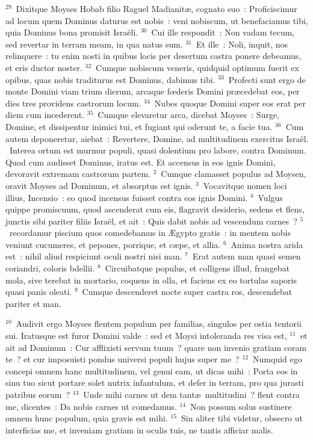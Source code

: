 ${}^{29}$~Dixitque Moyses Hobab filio Raguel Madianit\ae , cognato suo~: Proficiscimur ad locum quem Dominus daturus est nobis~: veni nobiscum, ut benefaciamus tibi, quia Dominus bona promisit Isra\"eli.
${}^{30}$~Cui ille respondit~: Non vadam tecum, sed revertar in terram meam, in qua natus sum.
${}^{31}$~Et ille~: Noli, inquit, nos relinquere~: tu enim nosti in quibus locis per desertum castra ponere debeamus, et eris ductor noster.
${}^{32}$~Cumque nobiscum veneris, quidquid optimum fuerit ex opibus, quas nobis traditurus est Dominus, dabimus tibi.
${}^{33}$~Profecti sunt ergo de monte Domini viam trium dierum, arcaque fœderis Domini pr\ae cedebat eos, per dies tres providens castrorum locum.
${}^{34}$~Nubes quoque Domini super eos erat per diem cum incederent.
${}^{35}$~Cumque elevaretur arca, dicebat Moyses~: Surge, Domine, et dissipentur inimici tui, et fugiant qui oderunt te, a facie tua.
${}^{36}$~Cum autem deponeretur, aiebat~: Revertere, Domine, ad multitudinem exercitus Isra\"el.
~\lettrine[lines=10,image=true,loversize=0.05,lraise=-0.03]{I}{}nterea ortum est murmur populi, quasi dolentium pro labore, contra Dominum. Quod cum audisset Dominus, iratus est. Et accensus in eos ignis Domini, devoravit extremam castrorum partem.
${}^{2}$~Cumque clamasset populus ad Moysen, oravit Moyses ad Dominum, et absorptus est ignis.
${}^{3}$~Vocavitque nomen loci illius, Incensio~: eo quod incensus fuisset contra eos ignis Domini.
${}^{4}$~Vulgus quippe promiscuum, quod ascenderat cum eis, flagravit desiderio, sedens et flens, junctis sibi pariter filiis Isra\"el, et ait~: Quis dabit nobis ad vescendum carnes~?
${}^{5}$~recordamur piscium quos comedebamus in \AE gypto gratis~: in mentem nobis veniunt cucumeres, et pepones, porrique, et c\ae pe, et allia.
${}^{6}$~Anima nostra arida est~: nihil aliud respiciunt oculi nostri nisi man.
${}^{7}$~Erat autem man quasi semen coriandri, coloris bdellii.
${}^{8}$~Circuibatque populus, et colligens illud, frangebat mola, sive terebat in mortario, coquens in olla, et faciens ex eo tortulas saporis quasi panis oleati.
${}^{9}$~Cumque descenderet nocte super castra ros, descendebat pariter et man.


${}^{10}$~Audivit ergo Moyses flentem populum per familias, singulos per ostia tentorii sui. Iratusque est furor Domini valde~: sed et Moysi intoleranda res visa est,
${}^{11}$~et ait ad Dominum~: Cur afflixisti servum tuum~? quare non invenio gratiam coram te~? et cur imposuisti pondus universi populi hujus super me~?
${}^{12}$~Numquid ego concepi omnem hanc multitudinem, vel genui eam, ut dicas mihi~: Porta eos in sinu tuo sicut portare solet nutrix infantulum, et defer in terram, pro qua jurasti patribus eorum~?
${}^{13}$~Unde mihi carnes ut dem tant\ae\ multitudini~? flent contra me, dicentes~: Da nobis carnes ut comedamus.
${}^{14}$~Non possum solus sustinere omnem hunc populum, quia gravis est mihi.
${}^{15}$~Sin aliter tibi videtur, obsecro ut interficias me, et inveniam gratiam in oculis tuis, ne tantis afficiar malis.


